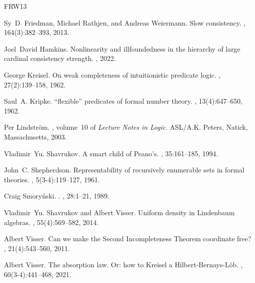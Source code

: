 \documentclass{amsart}
\begin{document}
%
%

\begin{thebibliography}{FRW13}

Sy~D. Friedman, Michael Rathjen, and Andreas Weiermann.
\newblock Slow consistency.
, 164(3):382--393, 2013.

Joel~David Hamkins.
\newblock Nonlinearity and illfoundedness in the hierarchy of large cardinal
  consistency strength.
, 2022.

George Kreisel.
\newblock On weak completeness of intuitionistic predicate logic.
, 27(2):139--158, 1962.

Saul~A. Kripke.
\newblock ``flexible'' predicates of formal number theory.
,
  13(4):647--650, 1962.

Per Lindstr{\"o}m.
, volume~10 of {\em Lecture Notes in
  Logic}.
\newblock ASL/A.K. Peters, Natick, Massachusetts, 2003.

Vladimir~Yu. Shavrukov.
\newblock A smart child of {P}eano's.
, 35:161--185, 1994.

John~C. Shepherdson.
\newblock Representability of recursively enumerable sets in formal theories.
,
  5(3-4):119--127, 1961.

Craig Smory\'{n}ski.
.
, 28:1--21, 1989.

Vladimir~Yu. Shavrukov and Albert Visser.
\newblock Uniform density in {L}indenbaum algebras.
, 55(4):569--582, 2014.

Albert Visser.
\newblock Can we make the {S}econd {I}ncompleteness {T}heorem coordinate free?
, 21(4):543--560, 2011.

Albert Visser.
\newblock The absorption law. {O}r: how to {K}reisel a
  {H}ilbert-{B}ernays-{L}{\"o}b.
, 60(3-4):441--468, 2021.

\end{thebibliography}
\end{document}
